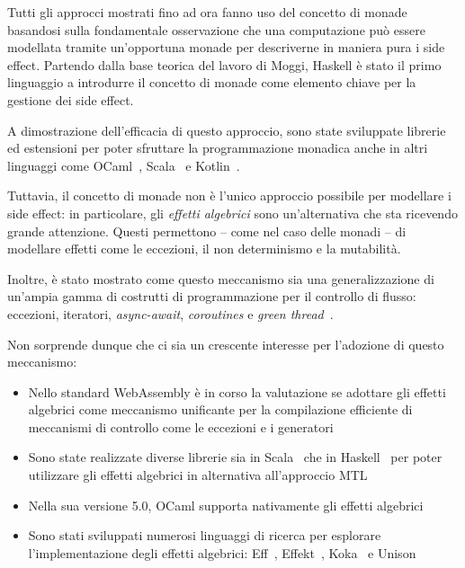 Tutti gli approcci mostrati fino ad ora fanno uso del concetto di monade basandosi sulla fondamentale osservazione che una computazione può essere modellata tramite un'opportuna monade per descriverne in maniera pura i side effect.
Partendo dalla base teorica del lavoro di Moggi, Haskell è stato il primo linguaggio a introdurre il concetto di monade come elemento chiave per la gestione dei side effect.

A dimostrazione dell'efficacia di questo approccio, sono state sviluppate librerie ed estensioni per poter sfruttare la programmazione monadica anche in altri linguaggi come OCaml~\cite{cit:ppx-let}, Scala~\cite{cit:zio,cit:cats} e Kotlin~\cite{cit:arrow-monad-comprehensions}.

Tuttavia, il concetto di monade non è l'unico approccio possibile per modellare i side effect: in particolare, gli \emph{effetti algebrici} sono un'alternativa che sta ricevendo grande attenzione.
Questi permettono -- come nel caso delle monadi -- di modellare effetti come le eccezioni, il non determinismo e la mutabilità\cite{cit:handlers-of-algebraic-effects}.

Inoltre, è stato mostrato come questo meccanismo sia una generalizzazione di un'ampia gamma di costrutti di programmazione per il controllo di flusso: eccezioni, iteratori, \emph{async-await}, \emph{coroutines} e \emph{green thread}~\cite{cit:algebraic-effect-handlers-go-mainstream}.

Non sorprende dunque che ci sia un crescente interesse per l'adozione di questo meccanismo:
\begin{itemize}
  \item Nello standard WebAssembly è in corso la valutazione se adottare gli effetti algebrici come meccanismo unificante per la compilazione efficiente di meccanismi di controllo come le eccezioni e i generatori~\cite{cit:wasmfx}
  \item Sono state realizzate diverse librerie sia in Scala~\cite{cit:scala-effekt} che in Haskell~\cite{cit:fused-effects,cit:effect-handlers,cit:extensible-effects} per poter utilizzare gli effetti algebrici in alternativa all'approccio MTL
  \item Nella sua versione 5.0, OCaml supporta nativamente gli effetti algebrici~\cite{cit:retrofitting-effect-handlers-onto-ocaml}
  \item Sono stati sviluppati numerosi linguaggi di ricerca per esplorare l'implementazione degli effetti algebrici: Eff~\cite{cit:eff-lang}, Effekt~\cite{cit:effekt-lang}, Koka~\cite{cit:koka-lang} e Unison~\cite{cit:unison-lang}
\end{itemize}
